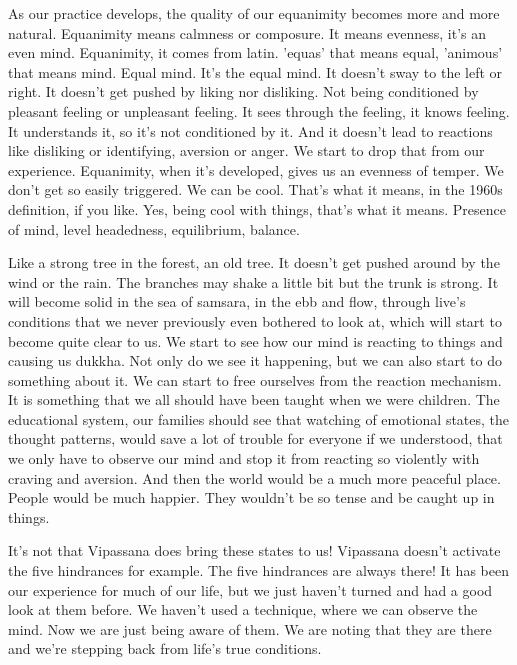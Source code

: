 \documentclass[letterpaper,10pt,english]{sphinxmanual}
\begin{document}
\sphinxAtStartPar
As our practice develops, the quality of our equanimity becomes more
and more natural. Equanimity means calmness or composure. It means evenness, it’s an even mind. Equanimity, it comes from latin. ’equas’ that means
equal, ’animous’ that means mind. Equal mind. It’s the equal mind. It doesn’t
sway to the left or right. It doesn’t get pushed by liking nor disliking. Not
being conditioned by pleasant feeling or unpleasant feeling. It sees through
the  feeling,  it  knows  feeling.  It  understands  it,  so  it’s  not  conditioned  by
it.  And  it  doesn’t  lead  to  reactions  like  disliking  or  identifying,  aversion
or anger. We start to drop that from our experience. Equanimity, when it’s
developed, gives us an evenness of temper. We don’t get so easily triggered.
We can be cool. That’s what it means, in the 1960s definition, if you like.
Yes, being cool with things, that’s what it means. Presence of mind, level
headedness, equilibrium, balance.

\sphinxAtStartPar
Like a strong tree in the forest, an old tree. It doesn’t get pushed around
by  the  wind  or  the  rain. The  branches  may  shake  a  little  bit  but  the  trunk
is  strong.  It  will  become  solid  in  the  sea  of  samsara,  in  the  ebb  and  flow,
through live’s conditions that we never previously even bothered to look at,
which will start to become quite clear to us. We start to see how our mind is
reacting to things and causing us dukkha. Not only do we see it happening,
but we can also start to do something about it. We can start to free ourselves
from the reaction mechanism. It is something that we all should have been
taught when we were children. The educational system, our families should
see that watching of emotional states, the thought patterns, would save a lot
  of trouble for everyone if we understood, that we only have to observe our
mind and stop it from reacting so violently with craving and aversion. And
then the world would be a much more peaceful place. People would be much
happier. They wouldn’t be so tense and be caught up in things.

\sphinxAtStartPar
It’s not that Vipassana does bring these states to us! Vipassana doesn’t
activate  the  five  hindrances  for  example.  The  five  hindrances  are  always
there! It has been our experience for much of our life, but we just haven’t
turned  and  had  a  good  look  at  them  before. We  haven’t  used  a  technique,
where we can observe the mind. Now we are just being aware of them. We
are noting that they are there and we’re stepping back from life’s true conditions.
\end{document}
